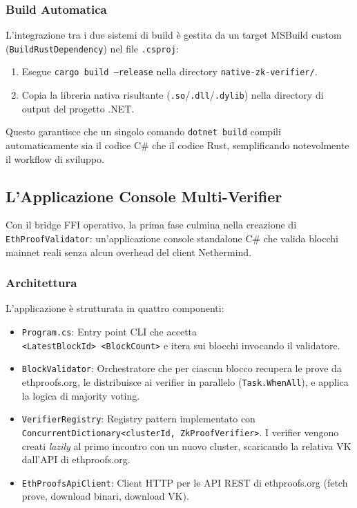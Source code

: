\documentclass[12pt,a4paper,openright,twoside]{report}
\begin{document}
\subsubsection{Build Automatica}

L'integrazione tra i due sistemi di build è gestita da un target MSBuild custom (\texttt{BuildRustDependency}) nel file \texttt{.csproj}:

\begin{enumerate}
    \item Esegue \texttt{cargo build --release} nella directory \texttt{native-zk-verifier/}.
    \item Copia la libreria nativa risultante (\texttt{.so}/\texttt{.dll}/\texttt{.dylib}) nella directory di output del progetto .NET.
\end{enumerate}

Questo garantisce che un singolo comando \texttt{dotnet build} compili automaticamente sia il codice C\# che il codice Rust, semplificando notevolmente il workflow di sviluppo.

\subsection{L'Applicazione Console Multi-Verifier}

Con il bridge FFI operativo, la prima fase culmina nella creazione di \texttt{EthProofValidator}: un'applicazione console standalone C\# che valida blocchi mainnet reali senza alcun overhead del client Nethermind.

\subsubsection{Architettura}

L'applicazione è strutturata in quattro componenti:

\begin{itemize}
    \item \texttt{Program.cs}: Entry point CLI che accetta \\\texttt{<LatestBlockId> <BlockCount>} e itera sui blocchi invocando il validatore.
    \item \texttt{BlockValidator}: Orchestratore che per ciascun blocco recupera le prove da ethproofs.org, le distribuisce ai verifier in parallelo (\texttt{Task.WhenAll}), e applica la logica di majority voting.
    \item \texttt{VerifierRegistry}: Registry pattern implementato con \\ \texttt{ConcurrentDictionary<clusterId, ZkProofVerifier>}. I verifier vengono creati \textit{lazily} al primo incontro con un nuovo cluster, scaricando la relativa VK dall'API di ethproofs.org.
    \item \texttt{EthProofsApiClient}: Client HTTP per le API REST di ethproofs.org (fetch prove, download binari, download VK).
\end{itemize}
\end{document}
